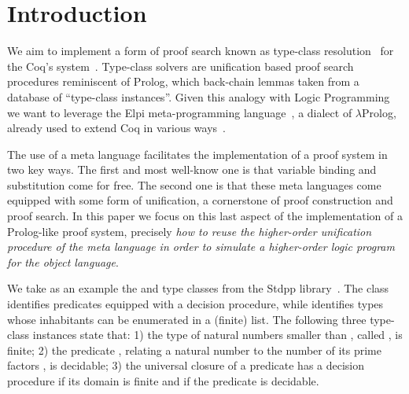 \documentclass[sigconf,natbib=false,review]{acmart}
\begin{document}

\maketitle

\section{Introduction}
\label{sec:intro}
We aim to implement a
form of proof search known as type-class resolution~\cite{wadler89,sozeau08}
for the Coq's system~\cite{Coq-refman}.
Type-class solvers are unification based proof search procedures
reminiscent of Prolog, which back-chain lemmas taken
from a database of ``type-class instances''. Given this
analogy with Logic Programming we want to leverage the
Elpi meta-programming language~\cite{tassi:hal-01637063},
a dialect of $\lambda$Prolog, already used to extend
Coq in various ways~\cite{tassi:hal-01637063,tassi:hal-01897468,gregoire:hal-03800154,newtc}.

The use of a meta language facilitates the implementation of a
proof system in two key ways. The first and most well-know one is that variable binding and
substitution come for free. %
The second one is that these meta languages come equipped with some form
of unification, a cornerstone of proof construction and proof search.
In this paper we focus on this last aspect of the implementation of
a Prolog-like proof system, precisely \emph{how to reuse the higher-order
unification procedure of the meta language in order to simulate a
higher-order logic program for the object language}.

We take as an example the  and  type classes
from the Stdpp
library~\cite{JUNG_KREBBERS_JOURDAN_BIZJAK_BIRKEDAL_DREYER_2018}.
The class  
identifies predicates equipped with a decision procedure, while
 identifies types whose inhabitants can be enumerated in a (finite) list.
The following three type-class instances state that:
1) the type of natural numbers smaller than , called ,
is finite;
2) the predicate , relating a natural number
 to the number of its prime factors , is decidable;
3) the universal closure of a predicate has a decision procedure if
its domain is finite and if the predicate is decidable.
\end{document}

